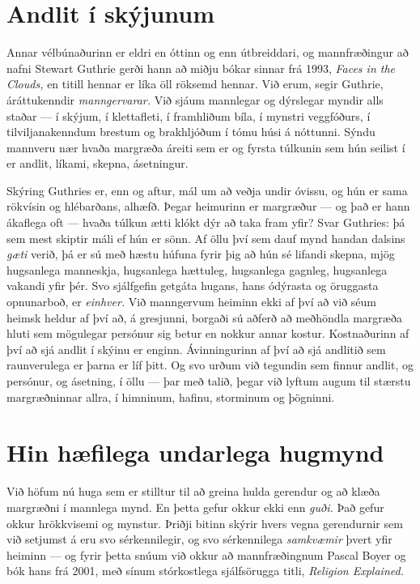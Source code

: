 \section*{Andlit í skýjunum}

Annar vélbúnaðurinn er eldri en óttinn og enn útbreiddari, og mannfræðingur að nafni Stewart Guthrie gerði hann að miðju bókar sinnar frá 1993, \emph{Faces in the Clouds,} en titill hennar er líka öll röksemd hennar. Við erum, segir Guthrie, áráttukenndir \emph{manngervarar.} Við sjáum mannlegar og dýrslegar myndir alls staðar — í skýjum, í klettafleti, í framhliðum bíla, í mynstri veggfóðurs, í tilviljanakenndum brestum og brakhljóðum í tómu húsi á nóttunni. Sýndu mannveru nær hvaða margræða áreiti sem er og fyrsta túlkunin sem hún seilist í er andlit, líkami, skepna, ásetningur.

Skýring Guthries er, enn og aftur, mál um að veðja undir óvissu, og hún er sama rökvísin og hlébarðans, alhæfð. Þegar heimurinn er margræður — og það er hann ákaflega oft — hvaða túlkun ætti klókt dýr að taka fram yfir? Svar Guthries: þá sem mest skiptir máli ef hún er sönn. Af öllu því sem dauf mynd handan dalsins \emph{gæti} verið, þá er sú með hæstu húfuna fyrir þig að hún sé lifandi skepna, mjög hugsanlega manneskja, hugsanlega hættuleg, hugsanlega gagnleg, hugsanlega vakandi yfir þér. Svo sjálfgefin getgáta hugans, hans ódýrasta og öruggasta opnunarboð, er \emph{einhver.} Við manngervum heiminn ekki af því að við séum heimsk heldur af því að, á gresjunni, borgaði sú aðferð að meðhöndla margræða hluti sem mögulegar persónur sig betur en nokkur annar kostur. Kostnaðurinn af því að sjá andlit í skýinu er enginn. Ávinningurinn af því að sjá andlitið sem raunverulega er þarna er líf þitt. Og svo urðum við tegundin sem finnur andlit, og persónur, og ásetning, í öllu — þar með talið, þegar við lyftum augum til stærstu margræðninnar allra, í himninum, hafinu, storminum og þögninni.

\section*{Hin hæfilega undarlega hugmynd}

Við höfum nú huga sem er stilltur til að greina hulda gerendur og að klæða margræðni í mannlega mynd. En þetta gefur okkur ekki enn \emph{guði.} Það gefur okkur hrökkvisemi og mynstur. Þriðji bitinn skýrir hvers vegna gerendurnir sem við setjumst á eru svo sérkennilegir, og svo sérkennilega \emph{samkvæmir} þvert yfir heiminn — og fyrir þetta snúum við okkur að mannfræðingnum Pascal Boyer og bók hans frá 2001, með sínum stórkostlega sjálfsörugga titli, \emph{Religion Explained.}

